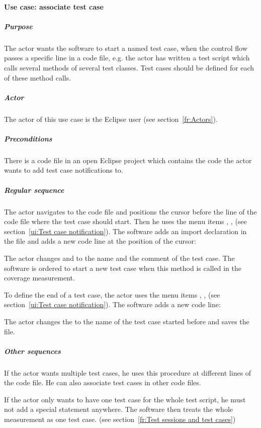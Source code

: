 \paragraph{Use case: associate test case}
\subparagraph{Purpose}
The actor wants the software to start a named test case, when the control flow passes a specific line in a code file, e.g. the actor has written a test script which calls several methods of several test classes. Test cases should be defined for each of these method calls.
\subparagraph{Actor}
The actor of this use case is the Eclipse user (see section~\ref{fr:Actors}).
\subparagraph{Preconditions}
There is a code file in an open Eclipse project which contains the code the actor wants to add test case notifications to.
\subparagraph{Regular sequence}
The actor navigates to the code file and positions the cursor before the line of the code file where the test case should start. Then he uses the menu items , ,  (see section~\ref{ui:Test case notification}). The software adds an import declaration in the file and adds a new code line at the position of the cursor:
\begin{quote}
\end{quote}
\par
The actor changes  and  to the name and the comment of the test case. The software is ordered to start a new test case when this method is called in the coverage measurement.
\par
To define the end of a test case, the actor uses the menu items , ,  (see section~\ref{ui:Test case notification}). The software adds a new code line:
\begin{quote}
\end{quote}
\par
The actor changes the  to the name of the test case started before and saves the file.
\subparagraph{Other sequences}
If the actor wants multiple test cases, he uses this procedure at different lines of the code file. He can also associate test cases in other code files.
\par
If the actor only wants to have one test case for the whole test script, he must not add a special statement anywhere. The software then treats the whole measurement as one test case. (see section~\ref{fr:Test sessions and test cases})
